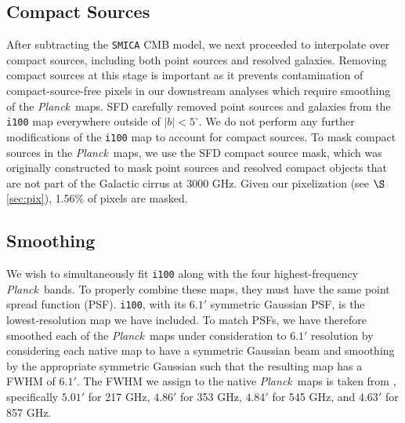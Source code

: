\documentclass{emulateapj}
\newcommand{\PLANCK}{{\it Planck}}
\begin{document}
\subsection{Compact Sources}
\label{sec:ptsrc}
After subtracting the \verb|SMICA| CMB model, we next proceeded to interpolate 
over compact sources, including both point sources and resolved galaxies. 
Removing compact sources at this stage is important as it prevents 
contamination of compact-source-free pixels in our downstream analyses which 
require smoothing of the \PLANCK~maps. SFD carefully removed point sources and 
galaxies from the \verb|i100| map everywhere outside of 
$|b|$$<$$5^{\circ}$. We do not perform any further modifications of the 
\verb|i100| map to account for compact sources. To mask compact sources in the 
\PLANCK~maps, we use the SFD compact source mask, which was originally 
constructed to mask point sources and resolved compact objects that are not 
part of the Galactic cirrus at 3000 GHz. Given our pixelization (see 
$\S$\ref{sec:pix}), 1.56\% of pixels are masked. 



\subsection{Smoothing}
\label{sec:smth}
We wish to simultaneously fit \verb|i100| along with the four 
highest-frequency \PLANCK~bands. To properly combine these maps, they must have
 the same point spread function (PSF). \verb|i100|, with its $6.1'$ symmetric 
Gaussian PSF, is the lowest-resolution map we have included. To match PSFs, we 
have therefore smoothed each of the \PLANCK~maps under consideration to $6.1'$ 
resolution by considering each native map to have a symmetric Gaussian beam and
 smoothing by the appropriate symmetric Gaussian such that the resulting map 
has a FWHM of $6.1'$. The FWHM we assign to the native \PLANCK~maps is taken 
from \cite{planckbeam}, specifically $5.01'$ for 217 GHz, $4.86'$ for 353 GHz, 
$4.84'$ for 545 GHz, and $4.63'$ for 857 GHz.
\end{document}
